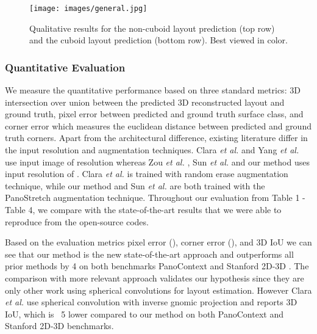 \documentclass[final]{cvpr}
\begin{document}
\begin{figure*}[!t]
    \centering
    \texttt{[image: images/general.jpg]}
    \caption{Qualitative results for the non-cuboid layout prediction (top row) and the cuboid layout prediction (bottom row). Best viewed in color.}
    \label{fig:layout}
\end{figure*}


\subsubsection{Quantitative Evaluation}\label{subsec:quantitative}

We measure the quantitative performance based on three standard metrics: 3D intersection over union between the predicted 3D reconstructed layout and ground truth, pixel error between predicted and ground truth surface class, and corner error which measures the euclidean distance between predicted and ground truth corners. Apart from the architectural difference, existing literature differ in the input resolution and augmentation techniques. Clara \textit{et al.} \cite{fernandez2020corners} and Yang \textit{et al.} \cite{yang2019dula} use input image of resolution  whereas Zou \textit{et al.} \cite{zou2018layoutnet}, Sun \textit{et al.} \cite{sun2019horizonnet} and our method uses input resolution of . Clara \textit{et al.} \cite{fernandez2020corners} is trained with random erase augmentation technique, while our method and Sun \textit{et al.} \cite{sun2019horizonnet} are both trained with the PanoStretch augmentation technique. Throughout our evaluation from Table 1 - Table 4, we compare with the state-of-the-art results that we were able to reproduce from the open-source codes. 

Based on the evaluation metrics pixel error (), corner error (), and 3D IoU we can see that our method is the new state-of-the-art approach and  outperforms all prior methods by  4 on both benchmarks PanoContext \cite{zhang2014panocontext} and Stanford 2D-3D \cite{armeni2017joint}. The comparison with more relevant approach \cite{fernandez2020corners} validates our hypothesis since they are only other work using spherical convolutions for layout estimation. However Clara \textit{et al.} \cite{fernandez2020corners} use spherical convolution with inverse gnomic projection and reports 3D IoU, which is  ~5 lower compared to our method on both PanoContext \cite{zhang2014panocontext} and Stanford 2D-3D \cite{armeni2017joint} benchmarks. 
\end{document}
